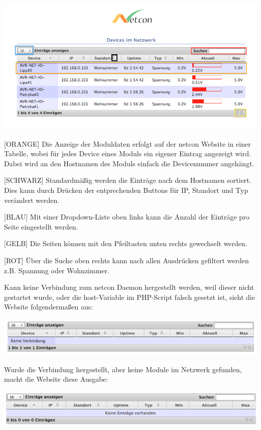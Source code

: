 \documentclass[a4paper,14pt,headsepline]{scrartcl}
\begin{document}
\includegraphics[width=0.85 \paperwidth]{./bilder/website2.png}

[ORANGE] Die Anzeige der Moduldaten erfolgt auf der netcon Website in einer Tabelle, wobei für jedes Device eines Moduls ein eigener Eintrag angezeigt wird. Dabei wird an den Hostnamen des Moduls einfach die Devicenummer angehängt.
 
[SCHWARZ] Standardmäßig werden die Einträge nach dem Hostnamen sortiert. Dies kann durch Drücken der entprechenden Buttons für IP, Standort und Typ verändert werden.  
 
\newpage
 
[BLAU] Mit einer Dropdown-Liste oben links kann die Anzahl der Einträge pro Seite eingestellt werden.
 
[GELB] Die Seiten können mit den Pfeiltasten unten rechts gewechselt werden.
 
[ROT] Über die Suche oben rechts kann nach allen Ausdrücken gefiltert werden z.B. Spannung oder Wohnzimmer.   
 
Kann keine Verbindung zum netcon Daemon hergestellt werden, weil dieser nicht gestartet wurde, oder die host-Variable im PHP-Script falsch gesetzt ist, sieht die Website folgendermaßen aus:
 
\includegraphics[width=0.85 \paperwidth]{./bilder/no_connection.png}

Wurde die Verbindung hergestellt, aber keine Module im Netzwerk gefunden, macht die Website diese Ausgabe: 

\includegraphics[width=0.85 \paperwidth]{./bilder/no_modules.png} 
\end{document}
